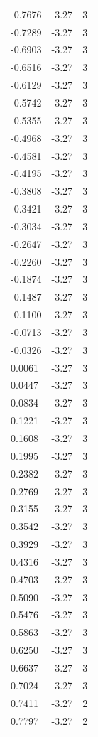 \begin{longtable}{lrr}
  -0.7676 & -3.27 & 3 \\
  -0.7289 & -3.27 & 3 \\
  -0.6903 & -3.27 & 3 \\
  -0.6516 & -3.27 & 3 \\
  -0.6129 & -3.27 & 3 \\
  -0.5742 & -3.27 & 3 \\
  -0.5355 & -3.27 & 3 \\
  -0.4968 & -3.27 & 3 \\
  -0.4581 & -3.27 & 3 \\
  -0.4195 & -3.27 & 3 \\
  -0.3808 & -3.27 & 3 \\
  -0.3421 & -3.27 & 3 \\
  -0.3034 & -3.27 & 3 \\
  -0.2647 & -3.27 & 3 \\
  -0.2260 & -3.27 & 3 \\
  -0.1874 & -3.27 & 3 \\
  -0.1487 & -3.27 & 3 \\
  -0.1100 & -3.27 & 3 \\
  -0.0713 & -3.27 & 3 \\
  -0.0326 & -3.27 & 3 \\
  0.0061 & -3.27 & 3 \\
  0.0447 & -3.27 & 3 \\
  0.0834 & -3.27 & 3 \\
  0.1221 & -3.27 & 3 \\
  0.1608 & -3.27 & 3 \\
  0.1995 & -3.27 & 3 \\
  0.2382 & -3.27 & 3 \\
  0.2769 & -3.27 & 3 \\
  0.3155 & -3.27 & 3 \\
  0.3542 & -3.27 & 3 \\
  0.3929 & -3.27 & 3 \\
  0.4316 & -3.27 & 3 \\
  0.4703 & -3.27 & 3 \\
  0.5090 & -3.27 & 3 \\
  0.5476 & -3.27 & 3 \\
  0.5863 & -3.27 & 3 \\
  0.6250 & -3.27 & 3 \\
  0.6637 & -3.27 & 3 \\
  0.7024 & -3.27 & 3 \\
  0.7411 & -3.27 & 2 \\
  0.7797 & -3.27 & 2 \\

\end{longtable}
